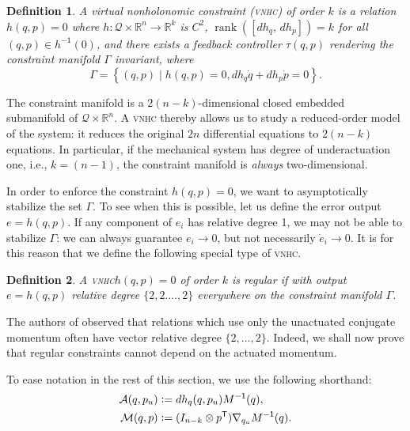 \documentclass[journal,twoside,web, twocolumn,draftcls]{ieeecolor}
\newtheorem{defn}{Definition} %
\DeclareMathOperator{\Rank}{rank}
\newcommand*{\rank}[1]{\Rank\left(#1\right)}
\newcommand*{\tpose}{^\mathsf{T}}
\newcommand*{\inv}{^\mathsf{-1}}
\newcommand*{\R}{\mathbb{R}}
\newcommand*{\Minv}{M^\mathsf{-1}}
\newcommand*{\Id}[1]{I_{#1}}
\newcommand*{\eqdef}{\vcentcolon=}
\newcommand*{\vnhc}{\textsc{vnhc}\xspace}
\begin{document}
\begin{defn}\label{defn:vnhc}
    A \textit{virtual nonholonomic constraint} (\vnhc) \textit{of order \(k\)}
    is a relation \(h(q,p) = 0\) where 
    \(h : \mathcal{Q}\times\R^n \rightarrow \R^k\) is \(C^2\),
    \(\rank{\left[ dh_q,\, dh_p \right]} = k\) for all 
    \((q,p) \in h\inv(0)\), and there exists a feedback
    controller \(\tau(q,p)\) rendering the \textit{constraint manifold}
    \(\Gamma\) invariant, where
    \begin{equation}
        \Gamma = \left\{(q,p) \mid h(q,p) = 0, dh_q \dot{q} + dh_p \dot{p} = 0\right\}
        .
    \end{equation}
\end{defn}

The constraint manifold is a \(2(n-k)\)-dimensional closed embedded submanifold
of \(\mathcal{Q} \times \R^n\). A \vnhc thereby allows us to study a
reduced-order model of the system: it reduces the original \(2n\) differential
equations to \(2(n-k)\) equations. In particular, if the mechanical system has
degree of underactuation one, i.e., \(k = (n-1)\), the constraint manifold is
\textit{always} two-dimensional.

In order to enforce the constraint \(h(q,p) = 0\), we want to asymptotically
stabilize the set \(\Gamma\). To see when this is possible, let us define the
error output \(e = h(q,p)\). If any component of \(e_i\) has relative degree 1,
we may not be able to stabilize \(\Gamma\): we can always guarantee 
\(e_i \to 0\), but not necessarily \(\dot{e}_i \to 0\). It is for this reason
that we define the following special type of \vnhc.

\begin{defn}
    A \vnhc \(h(q,p) = 0\) of order \(k\) is \textit{regular} if  with output 
    \(e = h(q,p)\)   relative degree \(\{2,2.\ldots,2\}\) everywhere on the
    constraint manifold \(\Gamma\).
\end{defn}

The authors of
\cite{nhvc_dynamic_walking,hybrid_zero_dynamics_bipedal_nhvcs}
observed that relations which use only the unactuated conjugate momentum
often have vector relative degree \(\{2,\ldots,2\}\).
Indeed, we shall now prove that regular constraints cannot depend on the
actuated momentum.

To ease notation in the rest of this section, we use the following shorthand:
\begin{align}
    \mathcal{A}(q,p_u) &\eqdef dh_q(q,p_u) \Minv(q) 
        ,\\
    \mathcal{M}(q,p) &\eqdef (\Id{n-k} \otimes p\tpose)\nabla_{q_u}\Minv(q) 
    .
\end{align}
\end{document}
